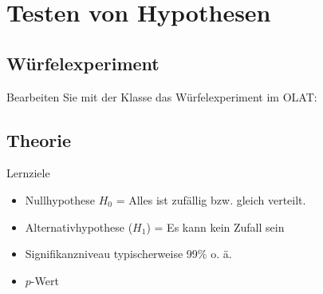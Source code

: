 
\section{Testen von Hypothesen}



\subsection{Würfelexperiment}

Bearbeiten Sie mit der Klasse das Würfelexperiment im OLAT:



\subsection{Theorie}

Lernziele

\begin{itemize}
\item Nullhypothese $H_0$ = Alles ist zufällig bzw. gleich verteilt.

\item Alternativhypothese ($H_1$) = Es kann kein Zufall sein

\item Signifikanzniveau typischerweise 99\% o. ä.

\item $p$-Wert
  
\end{itemize}


\newpage
